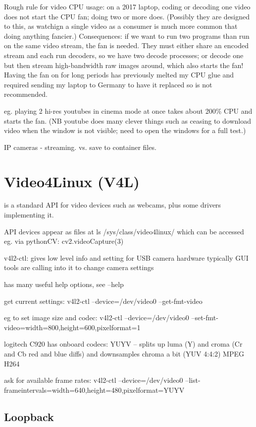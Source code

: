 \documentclass[oneside,english]{scrbook}
\begin{document}
Rough rule for video CPU usage: on a 2017 laptop, coding or decoding one video does not start the CPU fan; doing two or more does. (Possibly they are designed to this, as watchign a single video as a consumer is much more common that doing anything fancier.)  Consequences: if we want to run two programs than run on the same video stream, the fan is needed. They must either share an encoded stream and each run decoders, so we have two decode processes; or decode one but then stream high-bandwidth raw images around, which also starts the fan! Having the fan on for long periods has previously melted my CPU glue and required sending my laptop to Germany to have it replaced so is not recommended.

eg. playing 2 hi-res youtubes in cinema mode at once takes about 200\% CPU and starts the fan. (NB youtube does many clever things such as ceasing to download video when the window is not visible; need to open the windows for a full test.)

IP cameras - streaming.  vs. save to container files.

\chapter{Video4Linux (V4L)}

is a standard API for video devices such as webcams, plus some drivers
implementing it.

API devices appear as files at ls /sys/class/video4linux/ which can
be accessed eg. via pythonCV: cv2.videoCapture(3) 

v4l2-ctl: gives low level info and setting for USB camera hardware
typically GUI tools are calling into it to change camera settings

has many useful help options, see --help 

get current settings: v4l2-ctl --device=/dev/video0 --get-fmt-video

eg to set image size and codec: v4l2-ctl --device=/dev/video0 --set-fmt-video=width=800,height=600,pixelformat=1

logitech C920 has onboard codecs: YUYV -- splits up luma (Y) and croma
(Cr and Cb red and blue diffs) and downsamples chroma a bit (YUV 4:4:2)
MPEG H264

ask for available frame rates: v4l2-ctl --device=/dev/video0 --list-frameintervals=width=640,height=480,pixelformat=YUYV


\section{Loopback}
\label{loopback}
\end{document}
